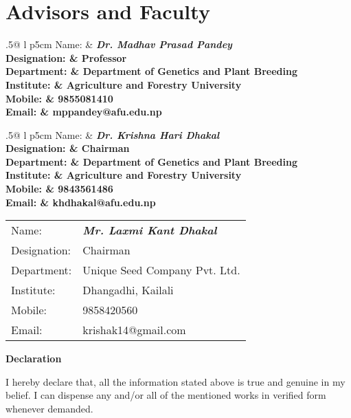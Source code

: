 \documentclass[11pt,a4paper,sans]{moderncv}
\makeatletter
\newcommand{\recommendation}[6]{%
  \noindent
  \begin{tabularx}{.5\linewidth}{@{\extracolsep{2pt}} l p{5cm} }
    Name: & \bfseries\textit{#1} \\
    Designation: & #2 \\
    Department: & #3 \\
    Institute: & #4 \\
    Mobile: & #5 \\
    Email: & #6 %
  \end{tabularx}%
}
\makeatother
\begin{document}
\section{Advisors and Faculty}
\recommendation{Dr. Madhav Prasad Pandey}
    {Professor}
    {Department of Genetics and Plant Breeding}
    {Agriculture and Forestry University}
    {9855081410} %
    {mppandey@afu.edu.np} %
  \recommendation{Dr. Krishna Hari Dhakal}
    {Chairman}
    {Department of Genetics and Plant Breeding}
    {Agriculture and Forestry University}
    {9843561486}
    {khdhakal@afu.edu.np}
  \recommendation{Mr. Laxmi Kant Dhakal}
    {Chairman}
    {Unique Seed Company Pvt. Ltd.}
    {Dhangadhi, Kailali}
    {9858420560}
    {krishak14@gmail.com}
    

\vspace{2cm}
\parbox[t]{\textwidth}{
{\bfseries Declaration}\par

I hereby declare that, all the information stated above is true and genuine in my belief. I can dispense any and/or all of the mentioned works in verified form whenever demanded.
}

\nocite{*}

\end{document}
